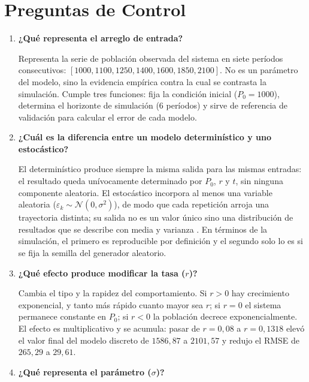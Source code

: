 \documentclass[11pt,a4paper]{article}
\begin{document}
\section{Preguntas de Control}

\begin{enumerate}[leftmargin=*]

  \item \textbf{¿Qu\'e representa el arreglo de entrada?}

  Representa la serie de poblaci\'on observada del sistema en siete per\'iodos
  consecutivos: $\left[1000, 1100, 1250, 1400, 1600, 1850, 2100\right]$. No es un
  par\'ametro del modelo, sino la evidencia emp\'irica contra la cual se contrasta la
  simulaci\'on. Cumple tres funciones: fija la condici\'on inicial ($P_0 = 1000$),
  determina el horizonte de simulaci\'on ($6$ per\'iodos) y sirve de referencia de
  validaci\'on para calcular el error de cada modelo.

  \item \textbf{¿Cu\'al es la diferencia entre un modelo determin\'istico y uno
  estoc\'astico?}

  El determin\'istico produce siempre la misma salida para las mismas entradas: el
  resultado queda un\'ivocamente determinado por $P_0$, $r$ y $t$, sin ninguna componente
  aleatoria. El estoc\'astico incorpora al menos una variable aleatoria
  ($\varepsilon_k \sim \mathcal{N}(0,\sigma^{2})$), de modo que cada repetici\'on arroja una
  trayectoria distinta; su salida no es un valor \'unico sino una distribuci\'on de
  resultados que se describe con media y varianza \cite{lawkelton2015,banks2010}. En
  t\'erminos de la simulaci\'on, el primero es reproducible por definici\'on y el segundo
  solo lo es si se fija la semilla del generador aleatorio.

  \item \textbf{¿Qu\'e efecto produce modificar la tasa ($r$)?}

  Cambia el tipo y la rapidez del comportamiento. Si $r>0$ hay crecimiento exponencial, y
  tanto m\'as r\'apido cuanto mayor sea $r$; si $r = 0$ el sistema permanece constante en
  $P_0$; si $r<0$ la poblaci\'on decrece exponencialmente. El efecto es multiplicativo y se
  acumula: pasar de $r = 0{,}08$ a $r = 0{,}1318$ elev\'o el valor final del modelo
  discreto de $1586{,}87$ a $2101{,}57$ y redujo el RMSE de $265{,}29$ a $29{,}61$.

  \item \textbf{¿Qu\'e representa el par\'ametro ($\sigma$)?}


\end{enumerate}
\end{document}

